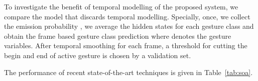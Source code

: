 %



%

To investigate the benefit of temporal modelling of the proposed system, we compare the model that discards temporal modelling. Specially, once, we collect the emission probability \emissionprob{}, we average the hidden states for each gesture class and obtain the frame based gesture class prediction \gestureEmissionProb where \gesturehiddenstateFrame denotes the gesture variables. After temporal smoothing for each frame, a threshold for cutting the begin and end of active gesture is chosen by a validation set.

The performance of recent state-of-the-art techniques is given in Table~\ref{tab:soa}.




